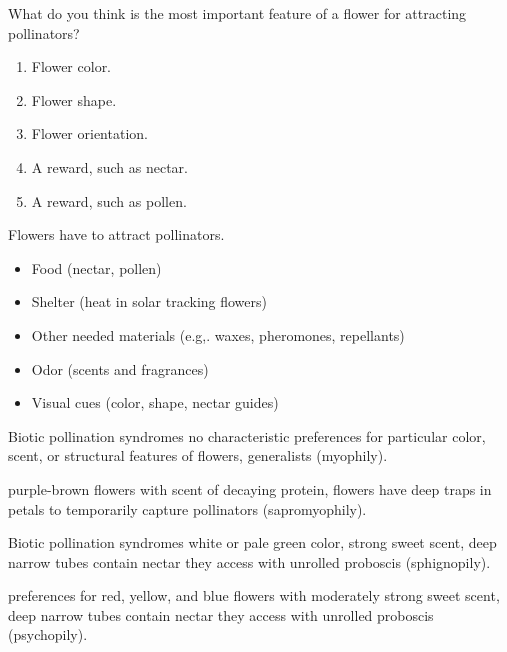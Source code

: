 \documentclass[t]{beamer}
\newcommand{\ques}[1]{\highlight{\textsc{q#1:}}}
\begin{document}
%
\begin{frame}[t]{\ques6 What do you think is the most important feature of a flower for attracting pollinators?}
	
	\begin{enumerate}
		\item Flower color.
		
		\item Flower shape.
		
		\item Flower orientation.
		
		\item A reward, such as nectar.
		
		\item A reward, such as pollen.

	\end{enumerate}
\end{frame}
%
\begin{frame}[t]{Flowers have  to attract pollinators.}
	\hangpara {}
	\begin{itemize}
		\item Food (nectar, pollen)
		\item Shelter (heat in solar tracking flowers)
		\item Other needed materials (e.g,. waxes, pheromones, repellants)
	\end{itemize}

	\hangpara {}
	\begin{itemize}
		\item Odor (scents and fragrances)
		\item Visual cues (color, shape, nectar guides)
	\end{itemize}
\end{frame}
%
\begin{frame}[t]{Biotic pollination syndromes}
	\hangpara {} no characteristic preferences for particular color, scent, or structural features of flowers, generalists (myophily).
	
	\hangpara {} purple-brown flowers with scent of decaying protein, flowers have deep traps in petals to temporarily capture pollinators (sapromyophily).

\end{frame}
%
\begin{frame}[t]{Biotic pollination syndromes}
	\hangpara {} white or pale green color, strong sweet scent, deep narrow tubes contain nectar they access with unrolled proboscis (sphignopily).
	
	\hangpara {} preferences for red, yellow, and blue flowers with moderately strong sweet scent, deep narrow tubes contain nectar they access with unrolled proboscis (psychopily).
	
\end{frame}
\end{document}
